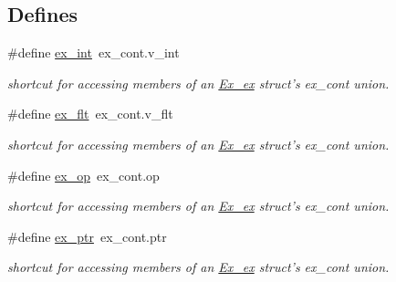 \subsection*{Defines}
\begin{DoxyCompactItemize}
\item 
\hypertarget{group__expr_gab46405eed108482db4fc1d4fc2ef7077}{
\#define \hyperlink{group__expr_gab46405eed108482db4fc1d4fc2ef7077}{ex\_\-int}~ex\_\-cont.v\_\-int}
\label{group__expr_gab46405eed108482db4fc1d4fc2ef7077}

\begin{DoxyCompactList}\small\item\em shortcut for accessing members of an \hyperlink{structEx__ex}{Ex\_\-ex} struct's ex\_\-cont union. \item\end{DoxyCompactList}\item 
\hypertarget{group__expr_gad3369510d47d2972732791c0f685387e}{
\#define \hyperlink{group__expr_gad3369510d47d2972732791c0f685387e}{ex\_\-flt}~ex\_\-cont.v\_\-flt}
\label{group__expr_gad3369510d47d2972732791c0f685387e}

\begin{DoxyCompactList}\small\item\em shortcut for accessing members of an \hyperlink{structEx__ex}{Ex\_\-ex} struct's ex\_\-cont union. \item\end{DoxyCompactList}\item 
\hypertarget{group__expr_ga9ebc5ab45aa899ff6f98c53dd4c31f49}{
\#define \hyperlink{group__expr_ga9ebc5ab45aa899ff6f98c53dd4c31f49}{ex\_\-op}~ex\_\-cont.op}
\label{group__expr_ga9ebc5ab45aa899ff6f98c53dd4c31f49}

\begin{DoxyCompactList}\small\item\em shortcut for accessing members of an \hyperlink{structEx__ex}{Ex\_\-ex} struct's ex\_\-cont union. \item\end{DoxyCompactList}\item 
\hypertarget{group__expr_gacf7a6e4e930397f16dca45aa0ecbcbcf}{
\#define \hyperlink{group__expr_gacf7a6e4e930397f16dca45aa0ecbcbcf}{ex\_\-ptr}~ex\_\-cont.ptr}
\label{group__expr_gacf7a6e4e930397f16dca45aa0ecbcbcf}

\begin{DoxyCompactList}\small\item\em shortcut for accessing members of an \hyperlink{structEx__ex}{Ex\_\-ex} struct's ex\_\-cont union. \item\end{DoxyCompactList}\end{DoxyCompactItemize}
